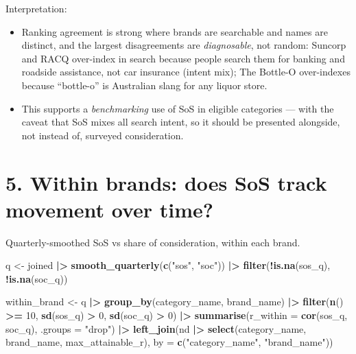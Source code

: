 \documentclass[
]{article}
\newenvironment{Shaded}{\begin{snugshade}}{\end{snugshade}}
\newcommand{\AttributeTok}[1]{\textcolor[rgb]{0.13,0.29,0.53}{#1}}
\newcommand{\DecValTok}[1]{\textcolor[rgb]{0.00,0.00,0.81}{#1}}
\newcommand{\FunctionTok}[1]{\textcolor[rgb]{0.13,0.29,0.53}{\textbf{#1}}}
\newcommand{\NormalTok}[1]{#1}
\newcommand{\OtherTok}[1]{\textcolor[rgb]{0.56,0.35,0.01}{#1}}
\newcommand{\SpecialCharTok}[1]{\textcolor[rgb]{0.81,0.36,0.00}{\textbf{#1}}}
\newcommand{\StringTok}[1]{\textcolor[rgb]{0.31,0.60,0.02}{#1}}
\providecommand{\tightlist}{%
  \setlength{\itemsep}{0pt}\setlength{\parskip}{0pt}}
\begin{document}
Interpretation:

\begin{itemize}
\tightlist
\item
  Ranking agreement is strong where brands are searchable and names are
  distinct, and the largest disagreements are \emph{diagnosable}, not
  random: Suncorp and RACQ over-index in search because people search
  them for banking and roadside assistance, not car insurance (intent
  mix); The Bottle-O over-indexes because ``bottle-o'' is Australian
  slang for any liquor store.
\item
  This supports a \emph{benchmarking} use of SoS in eligible categories
  --- with the caveat that SoS mixes all search intent, so it should be
  presented alongside, not instead of, surveyed consideration.
\end{itemize}

\hypertarget{within}{%
\section{5. Within brands: does SoS track movement over
time?}\label{within}}

Quarterly-smoothed SoS vs share of consideration, within each brand.

\begin{Shaded}
\begin{Highlighting}[]
\NormalTok{q }\OtherTok{\textless{}{-}}\NormalTok{ joined }\SpecialCharTok{|\textgreater{}}
  \FunctionTok{smooth\_quarterly}\NormalTok{(}\FunctionTok{c}\NormalTok{(}\StringTok{"sos"}\NormalTok{, }\StringTok{"soc"}\NormalTok{)) }\SpecialCharTok{|\textgreater{}}
  \FunctionTok{filter}\NormalTok{(}\SpecialCharTok{!}\FunctionTok{is.na}\NormalTok{(sos\_q), }\SpecialCharTok{!}\FunctionTok{is.na}\NormalTok{(soc\_q))}

\NormalTok{within\_brand }\OtherTok{\textless{}{-}}\NormalTok{ q }\SpecialCharTok{|\textgreater{}}
  \FunctionTok{group\_by}\NormalTok{(category\_name, brand\_name) }\SpecialCharTok{|\textgreater{}}
  \FunctionTok{filter}\NormalTok{(}\FunctionTok{n}\NormalTok{() }\SpecialCharTok{\textgreater{}=} \DecValTok{10}\NormalTok{, }\FunctionTok{sd}\NormalTok{(sos\_q) }\SpecialCharTok{\textgreater{}} \DecValTok{0}\NormalTok{, }\FunctionTok{sd}\NormalTok{(soc\_q) }\SpecialCharTok{\textgreater{}} \DecValTok{0}\NormalTok{) }\SpecialCharTok{|\textgreater{}}
  \FunctionTok{summarise}\NormalTok{(}\AttributeTok{r\_within =} \FunctionTok{cor}\NormalTok{(sos\_q, soc\_q), }\AttributeTok{.groups =} \StringTok{"drop"}\NormalTok{) }\SpecialCharTok{|\textgreater{}}
  \FunctionTok{left\_join}\NormalTok{(nd }\SpecialCharTok{|\textgreater{}} \FunctionTok{select}\NormalTok{(category\_name, brand\_name, max\_attainable\_r),}
            \AttributeTok{by =} \FunctionTok{c}\NormalTok{(}\StringTok{"category\_name"}\NormalTok{, }\StringTok{"brand\_name"}\NormalTok{))}
\end{Highlighting}
\end{Shaded}
\end{document}
